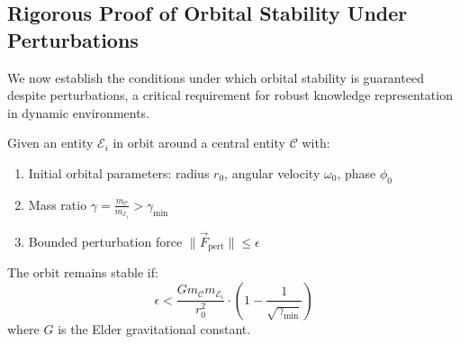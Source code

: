\subsection{Rigorous Proof of Orbital Stability Under Perturbations}

We now establish the conditions under which orbital stability is guaranteed despite perturbations, a critical requirement for robust knowledge representation in dynamic environments.

\begin{theorem}
Given an entity $\mathcal{E}_i$ in orbit around a central entity $\mathcal{C}$ with:
\begin{enumerate}
    \item Initial orbital parameters: radius $r_0$, angular velocity $\omega_0$, phase $\phi_0$
    \item Mass ratio $\gamma = \frac{m_{\mathcal{C}}}{m_{\mathcal{E}_i}} > \gamma_{\text{min}}$
    \item Bounded perturbation force $\|\vec{F}_{\text{pert}}\| \leq \epsilon$
\end{enumerate}

The orbit remains stable if:
\begin{equation}
\epsilon < \frac{G m_{\mathcal{C}} m_{\mathcal{E}_i}}{r_0^2} \cdot \left(1 - \frac{1}{\sqrt{\gamma_{\text{min}}}}\right)
\end{equation}
where $G$ is the Elder gravitational constant.
\end{theorem}

